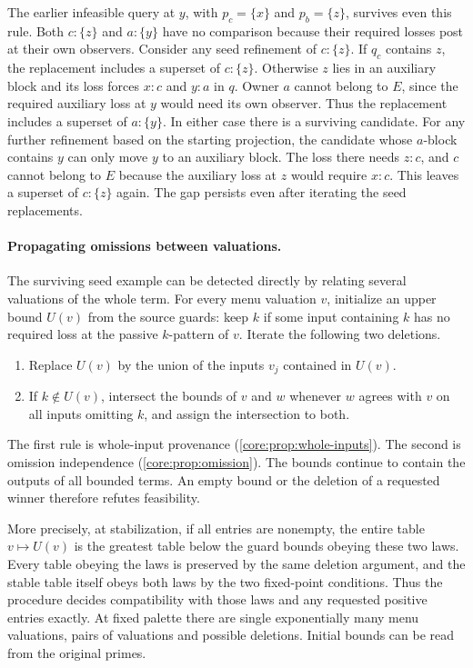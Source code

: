 The earlier infeasible query at $y$, with
$p_c=\{x\}$ and $p_b=\{z\}$, survives even this rule.
Both $c:\{z\}$ and $a:\{y\}$ have no comparison
because their required losses post at their own
observers. Consider any seed refinement of
$c:\{z\}$. If $q_c$ contains $z$, the replacement
includes a superset of $c:\{z\}$. Otherwise $z$
lies in an auxiliary block and its loss forces
$x{:}c$ and $y{:}a$ in $q$. Owner $a$ cannot
belong to $E$, since the required auxiliary loss
at $y$ would need its own observer. Thus the
replacement includes a superset of $a:\{y\}$.
In either case there is a surviving candidate.
For any further refinement based on the starting
projection, the candidate whose $a$-block contains
$y$ can only move $y$ to an auxiliary block.
The loss there needs $z{:}c$, and $c$ cannot
belong to $E$ because the auxiliary loss at $z$
would require $x{:}c$. This leaves a superset
of $c:\{z\}$ again. The gap persists even after
iterating the seed replacements.

\paragraph{Propagating omissions between valuations.}
The surviving seed example can be detected directly
by relating several valuations of the whole term.
For every menu valuation $v$, initialize an upper
bound $U(v)$ from the source guards: keep $k$ if
some input containing $k$ has no required loss
at the passive $k$-pattern of $v$. Iterate the
following two deletions.
\begin{enumerate}
\item Replace $U(v)$ by the union of the inputs
$v_j$ contained in $U(v)$.
\item If $k\notin U(v)$, intersect the bounds of
$v$ and $w$ whenever $w$ agrees with $v$ on all
inputs omitting $k$, and assign the intersection
to both.
\end{enumerate}
The first rule is whole-input provenance
(\cref{core:prop:whole-inputs}). The second is
omission independence (\cref{core:prop:omission}).
The bounds continue to contain the outputs of all
bounded terms. An empty bound or the deletion of
a requested winner therefore refutes feasibility.

More precisely, at stabilization, if all entries
are nonempty, the entire table $v\mapsto U(v)$ is
the greatest table below the guard bounds obeying
these two laws. Every table obeying the laws is
preserved by the same deletion argument, and the
stable table itself obeys both laws by the two
fixed-point conditions. Thus the procedure decides
compatibility with those laws and any requested
positive entries exactly. At fixed palette there
are single exponentially many menu valuations,
pairs of valuations and possible deletions. Initial
bounds can be read from the original primes.

